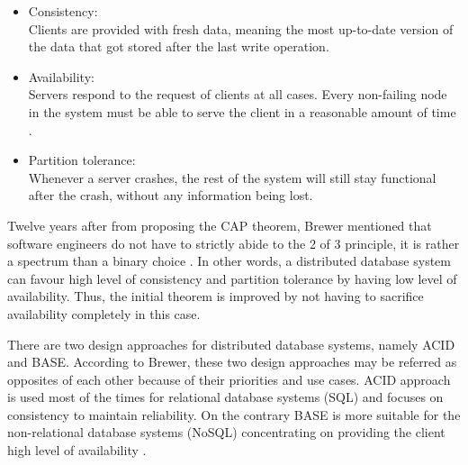 \begin{itemize}
  \item Consistency: \\
  Clients are provided with fresh data, meaning the most up-to-date version of the data that got stored after the last write operation.
  \item Availability: \\
  Servers respond to the request of clients at all cases. Every non-failing node in the system must be able to serve the client in a reasonable amount of time \cite{gilbert2002brewer}.
  \item Partition tolerance: \\
  Whenever a server crashes, the rest of the system will still stay functional after the crash, without any information being lost.
\end{itemize}

Twelve years after from proposing the CAP theorem, Brewer mentioned that software engineers do not have to strictly abide to the 2 of 3 principle, it is rather a spectrum than a binary choice \cite{brewer2012cap}. In other words, a distributed database system can favour high level of consistency and partition tolerance by having low level of availability. Thus, the initial theorem is improved by not having to sacrifice availability completely in this case.

There are two design approaches for distributed database systems, namely ACID and BASE. According to Brewer, these two design approaches may be referred as opposites of each other \cite{brewer2012cap} because of their priorities and use cases. ACID approach is used most of the times for relational database systems (SQL) and focuses on consistency to maintain reliability. On the contrary BASE is more suitable for the non-relational database systems (NoSQL) concentrating on providing the client high level of availability \cite{brewer2000cap}.

